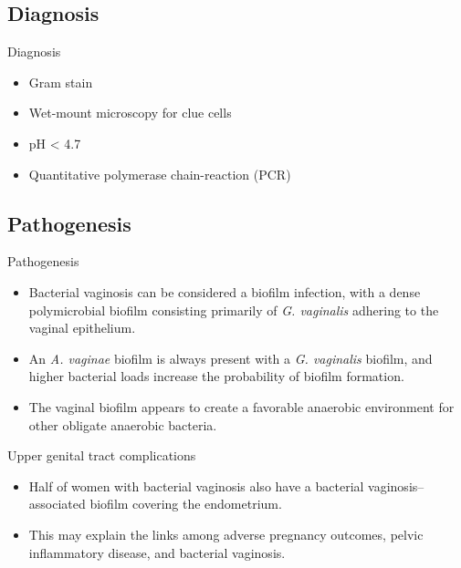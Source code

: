 \documentclass{beamer}
\begin{document}
\subsection{Diagnosis}
\begin{frame}{Diagnosis}
    \begin{itemize}
        \item Gram stain
        \item Wet-mount microscopy for clue cells
        \item pH < 4.7
        \item Quantitative polymerase chain-reaction (PCR)
    \end{itemize}
\end{frame}


\subsection{Pathogenesis}
\begin{frame}{Pathogenesis}
    \begin{itemize}
        \item Bacterial vaginosis can be considered a biofilm infection, with a
              dense polymicrobial biofilm consisting primarily of
              \textit{G. vaginalis} adhering to the vaginal epithelium.
        \item An \textit{A. vaginae} biofilm is always present with a
              \textit{G. vaginalis} biofilm, and higher bacterial loads
              increase the probability of biofilm formation.
        \item The vaginal biofilm appears to create a favorable anaerobic
              environment for other obligate anaerobic bacteria.
    \end{itemize}
\end{frame}

\begin{frame}{Upper genital tract complications}
    \begin{itemize}
        \item Half of women with bacterial vaginosis also have a bacterial
              vaginosis--associated biofilm covering the endometrium.
        \item This may explain the links among adverse pregnancy outcomes,
              pelvic inflammatory disease, and bacterial vaginosis.
    \end{itemize}
\end{frame}
\end{document}
